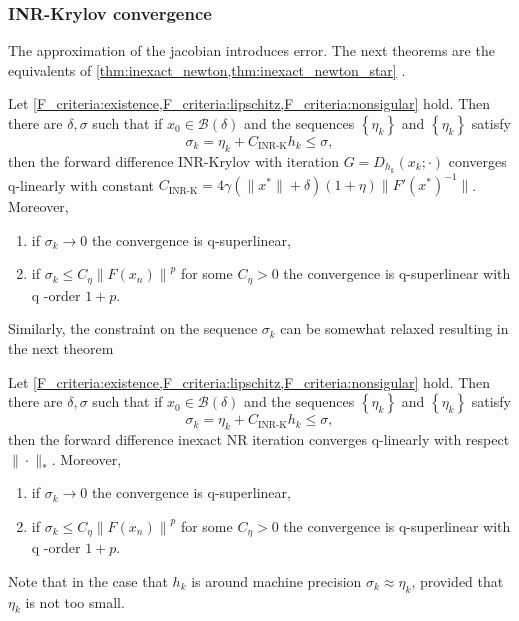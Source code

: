 \subsubsection{INR-Krylov convergence}
The approximation of the jacobian introduces error. The next theorems are the equivalents of \cref{thm:inexact_newton,thm:inexact_newton_star} \cite[Theorem 6.2.1]{nonlinear_cg_Kelley_1995}.
\begin{theorem}
  Let \cref{F_criteria:existence,F_criteria:lipschitz,F_criteria:nonsigular} hold. Then there are $\delta, \sigma$ such that if $x_0 \in \mathcal{B}(\delta)$ and the sequences $\left\{\eta_k\right\}$ and $\left\{\eta_k\right\}$ satisfy
  \[
    \sigma_k = \eta_k + C_{\textrm{INR-K}} h_k \leq \sigma,
  \]
  then the forward difference INR-Krylov with iteration $G=D_{h_k}(x_k; \cdot)$ converges q-linearly with constant $C_{\textrm{INR-K}} = 4\gamma(\|x^*\| + \delta)(1+\eta)\|F'(x^*)^{-1}\|$. Moreover,
  \begin{enumerate}
    \item if $\sigma_k \rightarrow 0$ the convergence is q-superlinear,
    \item if $\sigma_k \leq C_\eta\left\|F\left(x_n\right)\right\|^p$ for some $C_\eta>0$ the convergence is q-superlinear with q -order $1+p$.
  \end{enumerate}
  \label{thm:inr_krylov}
\end{theorem}
Similarly, the constraint on the sequence $\sigma_k$ can be somewhat relaxed resulting in the next theorem
\begin{theorem}
  Let \cref{F_criteria:existence,F_criteria:lipschitz,F_criteria:nonsigular} hold. Then there are $\delta, \sigma$ such that if $x_0 \in \mathcal{B}(\delta)$ and the sequences $\left\{\eta_k\right\}$ and $\left\{\eta_k\right\}$ satisfy
  \[
    \sigma_k = \eta_k + C_{\textrm{INR-K}} h_k \leq \sigma,
  \]
  then the forward difference inexact NR iteration converges q-linearly with respect $\|\cdot\|_*$. Moreover,
  \begin{enumerate}
    \item if $\sigma_k \rightarrow 0$ the convergence is q-superlinear,
    \item if $\sigma_k \leq C_\eta\left\|F\left(x_n\right)\right\|^p$ for some $C_\eta>0$ the convergence is q-superlinear with q -order $1+p$.
  \end{enumerate}
  \label{thm:inr_krylov_star}
\end{theorem}
Note that in the case that $h_k$ is around machine precision $\sigma_k \approx \eta_k$, provided that $\eta_k$ is not too small.

